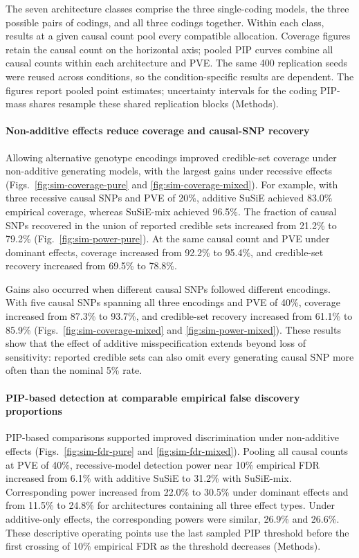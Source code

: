\documentclass[12pt]{article}
\begin{document}
The seven architecture classes comprise the three single-coding models,
the three possible pairs of codings, and all three codings together.
Within each class, results at a given causal count pool every compatible
allocation. Coverage figures retain the causal count on the horizontal
axis; pooled PIP curves combine all causal counts within each
architecture and PVE. The same 400 replication seeds were reused across
conditions, so the condition-specific results are dependent.
The figures report pooled point estimates; uncertainty intervals for
the coding PIP-mass shares resample these shared replication blocks
(Methods).

\paragraph{Non-additive effects reduce coverage and causal-SNP recovery}

Allowing alternative genotype encodings improved credible-set coverage
under non-additive generating models, with the largest gains under
recessive effects (Figs.~\ref{fig:sim-coverage-pure} and
\ref{fig:sim-coverage-mixed}). For example, with three recessive causal
SNPs and PVE of 20\%, additive SuSiE achieved 83.0\% empirical coverage,
whereas SuSiE-mix achieved 96.5\%. The fraction of causal SNPs recovered
in the union of reported credible sets increased from 21.2\% to 79.2\%
(Fig.~\ref{fig:sim-power-pure}). At the same causal count and PVE under
dominant effects, coverage increased from 92.2\% to 95.4\%, and
credible-set recovery increased from 69.5\% to 78.8\%.

Gains also occurred when different causal SNPs followed different
encodings. With five causal SNPs spanning all three encodings and PVE
of 40\%, coverage increased from 87.3\% to 93.7\%, and credible-set
recovery increased from 61.1\% to 85.9\%
(Figs.~\ref{fig:sim-coverage-mixed} and \ref{fig:sim-power-mixed}).
These results show that the effect of additive misspecification extends
beyond loss of sensitivity: reported credible sets can also omit every
generating causal SNP more often than the nominal 5\% rate.

\paragraph{PIP-based detection at comparable empirical false discovery proportions}

PIP-based comparisons supported improved discrimination under
non-additive effects (Figs.~\ref{fig:sim-fdr-pure} and
\ref{fig:sim-fdr-mixed}). Pooling all causal counts at PVE of 40\%,
recessive-model detection power near 10\% empirical FDR increased from
6.1\% with additive SuSiE to 31.2\% with SuSiE-mix. Corresponding power
increased from 22.0\% to 30.5\% under dominant effects and from 11.5\%
to 24.8\% for architectures containing all three effect types.
Under additive-only effects, the corresponding powers were similar,
26.9\% and 26.6\%. These descriptive operating points use the last
sampled PIP threshold before the first crossing of 10\% empirical FDR
as the threshold decreases (Methods).
\end{document}
